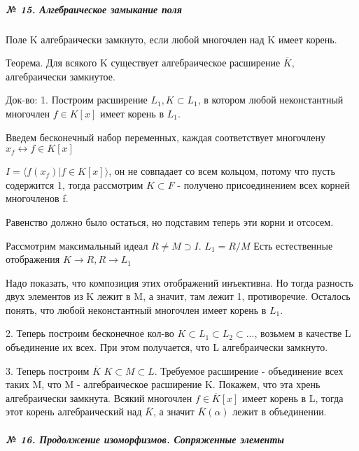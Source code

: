 \documentclass{article}
\begin{document}
\subparagraph{\tiny № 15. Алгебраическое замыкание поля}

\begin{flushleft}

Поле K алгебраически замкнуто, если любой многочлен над K имеет корень.

Теорема. Для всякого K существует алгебраическое расширение $\overline{K}$, алгебраически замкнутое.

Док-во:
1. Построим расширение $L_1, K \subset L_1$, в котором любой неконстантный многочлен $f \in K[x]$ имеет корень в $L_1$.

Введем бесконечный набор переменных, каждая соответствует многочлену $x_f \leftrightarrow f \in K[x]$

$I = \langle f(x_f) | f \in K[x] \rangle$, он не совпадает со всем кольцом, потому что пусть содержится 1, тогда рассмотрим $K \subset F$ - получено присоединением всех корней многочленов f.

Равенство должно было остаться, но подставим теперь эти корни и отсосем.

Рассмотрим максимальный идеал $R \neq M \supset I$. $L_1 = R/M$
Есть естественные отображения $K \rightarrow R, R \rightarrow L_1$

Надо показать, что композиция этих отображений инъективна. Но тогда разность двух элементов из K лежит в M, а значит, там лежит 1, противоречие. 
Осталось понять, что любой неконстантный многочлен имеет корень в $L_1$.

2. Теперь построим бесконечное кол-во $K \subset L_1 \subset L_2 \subset ...$, возьмем в качестве L объединение их всех. При этом получается, что L алгебраически замкнуто.

3. Теперь построим $\overline{K}$
$K \subset M \subset L$. Требуемое расширение - объединение всех таких M, что M - алгебраическое расширение K. Покажем, что эта хрень алгебраически замкнута. Всякий многочлен $f \in \overline{K}[x]$ имеет корень в L, тогда этот корень алгебраический над $\overline{K}$, а значит $\overline{K}(\alpha)$ лежит в объединении.

\end{flushleft}

\subparagraph{\tiny № 16. Продолжение изоморфизмов. Сопряженные элементы}
\end{document}
